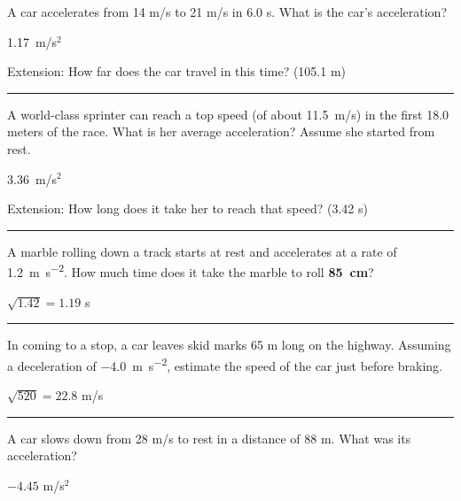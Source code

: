 \documentclass[12pt]{exam}
\begin{document}
\Large

\def\mystrut{\protect\rule[-2.2ex]{0ex}{2.2ex}} 
\qformat{ \textbf{Task \#\thequestion}
  \ifthenelse{\equal{\thequestion}{\thequestiontitle}}
    {}
    {: \emph{\thequestiontitle}}
  \mystrut  \hfill}


\begin{questions}


\question
  A car accelerates from 14 m/s to 21 m/s in 6.0 s.  What is the car's acceleration?

  \begin{solution}
    1.17~m/s$^2$

    Extension: How far does the car travel in this time? (105.1 m)
  \end{solution}


\vs \hrule \vs

\question
  A world-class sprinter can reach a top speed (of about 11.5~m/s) in the first 18.0 meters of the race.  What is her average acceleration?  Assume she started from rest.

  \begin{solution}
    3.36~m/s$^2$

    Extension: How long does it take her to reach that speed? (3.42 s)

  \end{solution}

\vs \hrule \vs

\question
  A marble rolling down a track starts at rest and accelerates at a rate of \SI{1.2}{\meter\per\second^2}.  How much time does it take the marble to roll {\bf 85~cm}?

  \begin{solution}
    $\sqrt{1.42}=1.19$ s
  \end{solution}

  

\vs \hrule \vs

\question
  In coming to a stop, a car leaves skid marks 65 m long on the highway.  Assuming a deceleration of \SI{-4.0}{\meter\per\second^2}, estimate the speed of the car just before braking.

  \begin{solution}
    $\sqrt{520}=22.8$ m/s
  \end{solution}

\vs \hrule \vs

\question
  A car slows down from 28 m/s to rest in a distance of 88 m. What was its acceleration?

  \begin{solution}
    $-4.45$ m/s$^2$
  \end{solution}



\end{questions}
\end{document}
